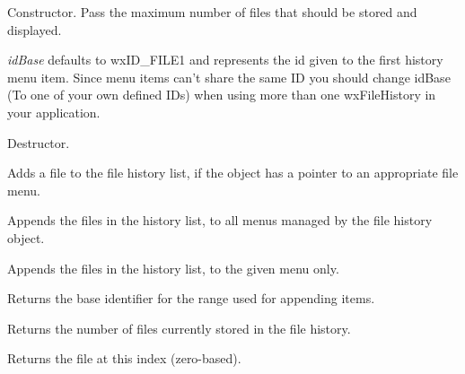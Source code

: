 
Constructor. Pass the maximum number of files that should be stored and
displayed.

{\it idBase} defaults to wxID\_FILE1 and represents the id given to the first
history menu item.  Since menu items can't share the same ID you should change
idBase (To one of your own defined IDs) when using more than one wxFileHistory
in your application.


\label{wxfilehistorydtor}


Destructor.


\label{wxfilehistoryaddfiletohistory}


Adds a file to the file history list, if the object has a pointer to an appropriate file menu.


\label{wxfilehistoryaddfilestomenu}

\label{wxfilehistoryaddfilestomenu}

Appends the files in the history list, to all menus managed by the file history object.


Appends the files in the history list, to the given menu only.


\label{wxfilehistorygetbaseid}


Returns the base identifier for the range used for appending items.


\label{wxfilehistorygetcount}


Returns the number of files currently stored in the file history.


\label{wxfilehistorygethistoryfile}


Returns the file at this index (zero-based).


